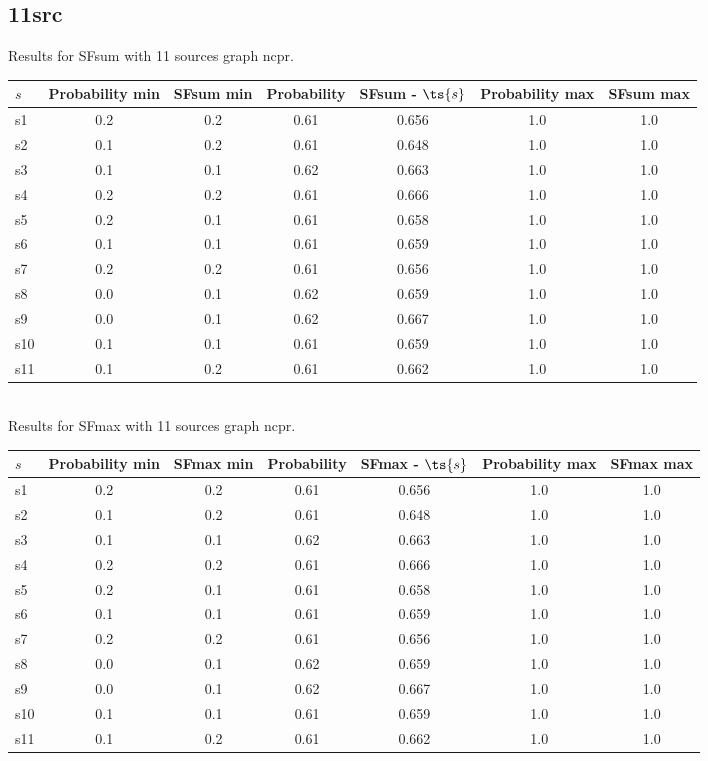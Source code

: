 \documentclass{article}
\begin{document}
\newpage

\subsection{11src}

\noindent Results for SFsum with 11 sources graph ncpr.

\noindent\begin{tabular}{|l|c|c|c|c|c|c|}
\hline
$s$& Probability min & SFsum min & Probability & SFsum - $\ts{s}$ & Probability max & SFsum max\\
\hline
s1 &0.2 & 0.2 & 0.61 & 0.656 & 1.0 & 1.0\\
\hline
s2 &0.1 & 0.2 & 0.61 & 0.648 & 1.0 & 1.0\\
\hline
s3 &0.1 & 0.1 & 0.62 & 0.663 & 1.0 & 1.0\\
\hline
s4 &0.2 & 0.2 & 0.61 & 0.666 & 1.0 & 1.0\\
\hline
s5 &0.2 & 0.1 & 0.61 & 0.658 & 1.0 & 1.0\\
\hline
s6 &0.1 & 0.1 & 0.61 & 0.659 & 1.0 & 1.0\\
\hline
s7 &0.2 & 0.2 & 0.61 & 0.656 & 1.0 & 1.0\\
\hline
s8 &0.0 & 0.1 & 0.62 & 0.659 & 1.0 & 1.0\\
\hline
s9 &0.0 & 0.1 & 0.62 & 0.667 & 1.0 & 1.0\\
\hline
s10 &0.1 & 0.1 & 0.61 & 0.659 & 1.0 & 1.0\\
\hline
s11 &0.1 & 0.2 & 0.61 & 0.662 & 1.0 & 1.0\\
\hline
\end{tabular}\\

\noindent Results for SFmax with 11 sources graph ncpr.

\noindent\begin{tabular}{|l|c|c|c|c|c|c|}
\hline
$s$& Probability min & SFmax min & Probability & SFmax - $\ts{s}$ & Probability max & SFmax max\\
\hline
s1 &0.2 & 0.2 & 0.61 & 0.656 & 1.0 & 1.0\\
\hline
s2 &0.1 & 0.2 & 0.61 & 0.648 & 1.0 & 1.0\\
\hline
s3 &0.1 & 0.1 & 0.62 & 0.663 & 1.0 & 1.0\\
\hline
s4 &0.2 & 0.2 & 0.61 & 0.666 & 1.0 & 1.0\\
\hline
s5 &0.2 & 0.1 & 0.61 & 0.658 & 1.0 & 1.0\\
\hline
s6 &0.1 & 0.1 & 0.61 & 0.659 & 1.0 & 1.0\\
\hline
s7 &0.2 & 0.2 & 0.61 & 0.656 & 1.0 & 1.0\\
\hline
s8 &0.0 & 0.1 & 0.62 & 0.659 & 1.0 & 1.0\\
\hline
s9 &0.0 & 0.1 & 0.62 & 0.667 & 1.0 & 1.0\\
\hline
s10 &0.1 & 0.1 & 0.61 & 0.659 & 1.0 & 1.0\\
\hline
s11 &0.1 & 0.2 & 0.61 & 0.662 & 1.0 & 1.0\\
\hline
\end{tabular}\\
\end{document}
